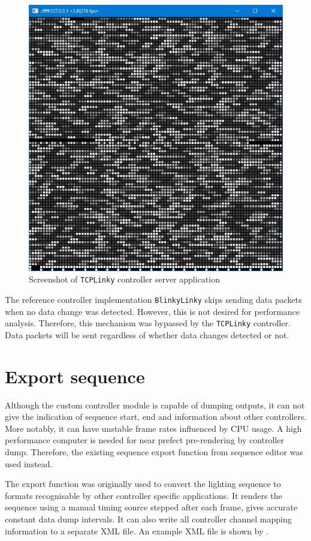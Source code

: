 \begin{figure}[t]
  \centering
  \includegraphics[width=0.6\columnwidth]{Figs/tcplinky_server.png}
  \caption{\footnotesize Screenshot of \texttt{TCPLinky} controller server application}
  \label{fig:tcplinky_server}
\end{figure}

The reference controller implementation \texttt{BlinkyLinky} skips sending data packets when no data change was detected. However, this is not desired for performance analysis. Therefore, this mechanism was bypassed by the \texttt{TCPLinky} controller. Data packets will be sent regardless of whether data changes detected or not.

\section{Export sequence}

Although the custom controller module is capable of dumping outputs, it can not give the indication of sequence start, end and information about other controllers. More notably, it can have unstable frame rates influenced by CPU usage. A high performance computer is needed for near prefect pre-rendering by controller dump. Therefore, the existing sequence export function from sequence editor was used instead.

The export function was originally used to convert the lighting sequence to formats recognisable by other controller specific applications. It renders the sequence using a manual timing source stepped after each frame, gives accurate constant data dump intervals. It can also write all controller channel mapping information to a separate XML file. An example XML file is shown by .

